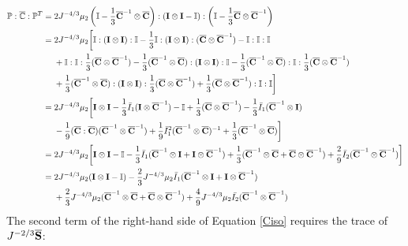\begin{equation} \label{part11}
\begin{split}
\mathbb{P} : {\overline{\mathbb{C}}} : {\mathbb{P}}^T 
= {} & 2J^{-4/3}\mu_2 \left(\mathbb{I} - \frac{1}{3}{\overline{\bold{C}}}^{-1} \otimes \overline{\bold{C}}\right)
: (\bold{I} \otimes \bold{I} - \mathbb{I}) : \left(\mathbb{I} - \frac{1}{3}\overline{\bold{C}} \otimes {\overline{\bold{C}}}^{-1}\right) \\
= {} & 2J^{-4/3}\mu_2 \bigg[\mathbb{I} : (\bold{I} \otimes \bold{I}) : \mathbb{I} - \frac{1}{3}\mathbb{I} : (\bold{I} \otimes \bold{I}) : (\overline{{\bold{C}}} \otimes {\overline{\bold{C}}}^{-1}) - \mathbb{I} : \mathbb{I} : \mathbb{I} \\
&+ \mathbb{I} : \mathbb{I} : \frac{1}{3}(\overline{\bold{C}} \otimes {\overline{\bold{C}}}^{-1}) - 
\frac{1}{3}({\overline{\bold{C}}}^{-1} \otimes \overline{\bold{C}} ) : (\bold{I} \otimes \bold{I}) : \mathbb{I}
- \frac{1}{3}({\overline{\bold{C}}}^{-1} \otimes \overline{\bold{C}} ) :  \mathbb{I} : \frac{1}{3}({\overline{\bold{C}}} \otimes {\overline{\bold{C}} }^{-1}) \\
&+ \frac{1}{3}(\overline{{\bold{C}}}^{-1} \otimes \overline{\bold{C}} ) : (\bold{I} \otimes \bold{I}) : \frac{1}{3}({\overline{\bold{C}}} \otimes {\overline{\bold{C}}}^{-1} ) + \frac{1}{3}({\overline{\bold{C}}} \otimes {\overline{\bold{C}}}^{-1}) : \mathbb{I} : \mathbb{I}
\bigg] \\
= {} & 2J^{-4/3}\mu_2 \bigg[\bold{I} \otimes \bold{I} - \frac{1}{3}\bar{I}_1(\bold{I} \otimes {\overline{\bold{C}}}^{-1}) - \mathbb{I} + \frac{1}{3}(\overline{\bold{C}} \otimes {\overline{\bold{C}}}^{-1}) -  \frac{1}{3}\bar{I}_1({\overline{\bold{C}}}^{-1} \otimes \bold{I})\\
&- \frac{1}{9}(\overline{\bold{C}} : \overline{\bold{C}})({\overline{\bold{C}}}^{-1} \otimes {\overline{\bold{C}}}^{-1})+ \frac{1}{9}{\bar{I}_1}^2({\overline{\bold{C}}}^{-1} \otimes {\overline{\bold{C}}})^{-1} +  \frac{1}{3}({\overline{\bold{C}}}^{-1} \otimes {\overline{\bold{C}}}) \bigg] \\
= {} & 2{J}^{-4/3}\mu_2 \bigg[ \bold{I} \otimes \bold{I} - \mathbb{I} - \frac{1}{3}\bar{I}_1({\overline{\bold{C}}}^{-1} \otimes \bold{I} + \bold{I}\otimes{\overline{\bold{C}}}^{-1} ) +
\frac{1}{3}({\overline{\bold{C}}}^{-1} \otimes \overline{\bold{C}} + \overline{\bold{C}}\otimes{\overline{\bold{C}}}^{-1} )  + \frac{2}{9}\bar{I}_2 ({\overline{\bold{C}}}^{-1} \otimes {\overline{\bold{C}}}^{-1}) \bigg] \\
= {} & 2{J}^{-4/3}\mu_2(\bold{I} \otimes \bold{I} - \mathbb{I}) - \frac{2}{3}J^{-4/3}\mu_2\bar{I}_1({\overline{\bold{C}}}^{-1} \otimes \bold{I} + \bold{I} \otimes {\overline{\bold{C}}}^{-1}) \\
&+
\frac{2}{3}J^{-4/3}\mu_2({\overline{\bold{C}}}^{-1} \otimes {\overline{\bold{C}}} + {\overline{\bold{C}}} \otimes {\overline{\bold{C}}}^{-1}) + \frac{4}{9}J^{-4/3}\mu_2\bar{I_2}({\overline{\bold{C}}}^{-1} \otimes {\overline{\bold{C}}}^{-1})
\end{split}
\end{equation}
The second term of the right-hand side of Equation \ref{Ciso} requires the trace of $J^{-2/3}\overline{\bold{S}}$:

